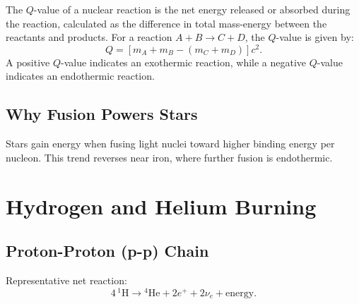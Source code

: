 \begin{theory}
The $Q$-value of a nuclear reaction is the net energy released or absorbed during the reaction, calculated as the difference in total mass-energy between the reactants and products. For a reaction $A + B \rightarrow C + D$, the $Q$-value is given by:
\begin{equation}
    Q = \left[m_A + m_B - (m_C + m_D)\right]c^2.    
\end{equation}
A positive $Q$-value indicates an exothermic reaction, while a negative $Q$-value indicates an endothermic reaction.
\end{theory}

\subsection{Why Fusion Powers Stars}
\begin{intuition}
Stars gain energy when fusing light nuclei toward higher binding energy per nucleon.
This trend reverses near iron, where further fusion is endothermic.
\end{intuition}

\section{Hydrogen and Helium Burning}
\subsection{Proton-Proton (p-p) Chain}

\begin{foundation}
Representative net reaction:
\begin{equation}
    4\,{}^1\text{H}\rightarrow{}^4\text{He}+2e^++2\nu_e+\text{energy}.
\end{equation}
\end{foundation}

